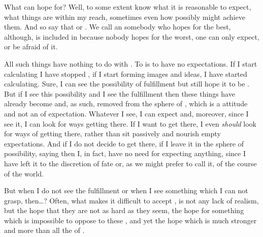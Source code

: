 %
What can  hope for? Well, to some extent  know what it is 
reasonable to expect, what things are within my reach, sometimes even 
how  possibly might achieve them. And so  say that  or . We call an  somebody who hopes for the best, 
although,  is included in  because nobody 
hopes for the worst, one can only expect, or be afraid of it. 

\subpa
All such things have nothing to do with . To  is to have no 
expectations. If I start calculating I have stopped , if I 
start forming images and ideas, I have started calculating. 
Sure, I can see the possibility of fulfillment but still hope it to 
be . But if I see this possibility and I see the 
fulfillment then these things have already become  and, as 
such, removed from the sphere of , which is a  
attitude and not an  of expectation. Whatever I see, I can 
expect and, moreover, since I see it, I can look for ways getting 
there. If I want to get there, I even {\em should} look for ways of getting 
there, rather than sit passively and nourish empty expectations. And 
if I do not decide to get there, if I leave it in the sphere of 
possibility, saying  then I, in fact, 
have no need for expecting anything, since I have left it to the 
discretion of fate or, as we might prefer to call it, of the course of 
the world. 

But when I do not see the fulfillment or when I see something which I 
can not grasp, then\ldots? Often, what makes it difficult to accept 
,  is not any lack of realism, 
but the hope that they are not as hard as they seem, the hope for 
something which is impossible to oppose to these  
, and yet the hope which is much  stronger and more
 than all the  of .

